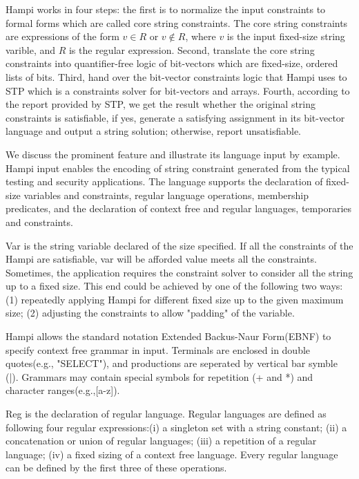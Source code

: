 Hampi works in four steps: the first is to normalize the input constraints to formal forms which are called core string constraints. The core string constraints are expressions of the form $v\in R$ or $v\notin R$, where $v$ is the input fixed-size string varible, and $R$ is the regular expression. Second, translate the core string constraints into quantifier-free logic of bit-vectors which are fixed-size, ordered lists of bits. Third, hand over the bit-vector constraints logic that Hampi uses to STP\cite{} which is a constraints solver for bit-vectors and arrays. Fourth, according to the report provided by STP, we get the result whether the original string constraints is satisfiable, if yes, generate a satisfying assignment in its bit-vector language and output a string solution; otherwise, report unsatisfiable. 

We discuss the prominent feature and illustrate its language input by example. Hampi input enables the encoding of string constraint generated from the typical testing and security applications. The language supports the declaration of fixed-size variables and constraints, regular language operations, membership predicates, and the declaration of context free and regular languages, temporaries and constraints.

Var is the string variable declared of the size specified. If all the constraints of the Hampi are satisfiable, var will be afforded value meets all the constraints. Sometimes, the application requires the constraint solver to consider all the string up to a fixed size. This end could be achieved by one of the following two ways: (1) repeatedly applying Hampi for different fixed size up to the given maximum size; (2) adjusting the constraints to allow "padding" of the variable. 

Hampi allows the standard notation Extended Backus-Naur Form(EBNF) to specify context free grammar in input. Terminals are enclosed in double quotes(e.g., "SELECT"), and productions are seperated by vertical bar symble (|). Grammars may contain special symbols for repetition (+ and *) and character ranges(e.g.,[a-z]).

Reg is the declaration of regular language. Regular languages are defined as following four regular expressions:(i) a singleton set with a string constant; (ii) a concatenation or union of regular languages; (iii) a repetition of a regular language; (iv) a fixed sizing of a context free language. Every regular language can be defined by the first three of these operations.  

